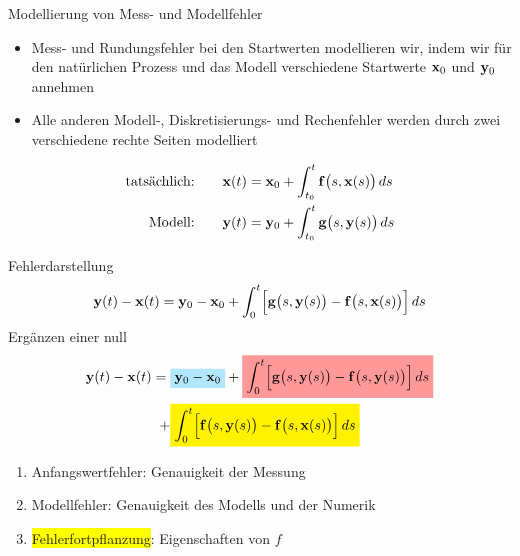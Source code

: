\begin{frame}{Modellierung von Mess- und Modellfehler}
  \begin{itemize}
  \item Mess- und Rundungsfehler bei den Startwerten modellieren wir,
    indem wir für den natürlichen Prozess und das Modell verschiedene
    Startwerte $\mathbf{x}_0$ und $\mathbf{y}_0$ annehmen
  \item Alle anderen Modell-, Diskretisierungs- und Rechenfehler
    werden durch zwei verschiedene rechte Seiten modelliert
  \end{itemize}
  \begin{align*}
    \text{tatsächlich:}\qquad \mathbf{x}(t)
    &= \mathbf{x}_0 + \int_{t_0}^t \mathbf{f}\bigl(s,\mathbf{x}(s)\bigr)\,ds \\
    \text{Modell:}\qquad \mathbf{y}(t)
    &= \mathbf{y}_0 + \int_{t_0}^t \mathbf{g}\bigl(s,\mathbf{y}(s)\bigr)\,ds
  \end{align*}
\end{frame}

\begin{frame}{Fehlerdarstellung}
  \begin{gather*}
    \mathbf{y}(t)-\mathbf{x}(t) = \mathbf{y}_0-\mathbf{x}_0
    + \int_0^t \Bigl[
    \mathbf{g}\bigl(s,\mathbf{y}(s)\bigr) - \mathbf{f}\bigl(s,\mathbf{x}(s)\bigr)\Bigr] \,ds
  \end{gather*}
  \pause
  Ergänzen einer null
  \begin{multline*}
    \vy(t)-\vx(t) = \colorbox{cyan!30!white}{\(\displaystyle \vy_0-\vx_0\)}
    + \colorbox{red!40!white}{\(\displaystyle
      \int_0^t \Bigl[
      \vg\bigl(s,\vy(s)\bigr) - \vf\bigl(s,\vy(s)\bigr)\Bigr] \,ds\)}\\
    + \colorbox{yellow}{\(\displaystyle
      \int_0^t \Bigl[
    \vf\bigl(s,\vy(s)\bigr) - \vf\bigl(s,\vx(s)\bigr)\Bigr] \,ds\)}
  \end{multline*}
  \begin{enumerate}
  \item \colorbox{cyan!40!white}{Anfangswertfehler}: Genauigkeit der Messung
  \item \colorbox{red!40!white}{Modellfehler}: Genauigkeit des Modells und der Numerik
  \item \colorbox{yellow}{Fehlerfortpflanzung}: Eigenschaften von $f$
  \end{enumerate}
\end{frame}

